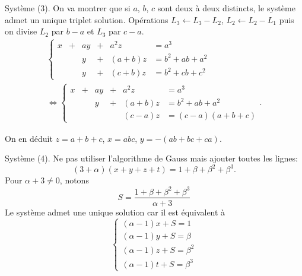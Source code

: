 Système (3). On va montrer que si $a$, $b$, $c$ sont deux à deux distincts, le système admet un unique triplet solution.\newline
Opérations $L_3 \leftarrow L_3 - L_2$, $L_2 \leftarrow L_2 - L_1$ puis on divise $L_2$ par $b-a$ et $L_3$ par $c-a$.
\begin{multline*}
  \left\lbrace 
  \begin{alignedat}{4}
    x &+& ay &+& a^2z   &= a^3 \\
      & & y  &+& (a+b)z &= b^2 + ab + a^2 \\
      & & y  &+& (c+b)z &= b^2 + cb + c^2
  \end{alignedat}
\right. \\
\Leftrightarrow
  \left\lbrace 
  \begin{alignedat}{4}
    x &+& ay &+& a^2z   &= a^3 \\
      & & y  &+& (a+b)z &= b^2 + ab + a^2 \\
      & &    & & (c-a)z &= (c-a)(a+b+c)
  \end{alignedat}
\right. .
\end{multline*}

On en déduit $z=a+b+c$, $x = abc$, $y=-(ab +bc+ca)$.

Système (4).\newline
Ne pas utiliser l'algorithme de Gauss mais ajouter toutes les lignes:
\[
  (3+\alpha)(x+y+z+t) = 1+\beta+\beta^2+\beta^3.
\]
Pour $\alpha + 3 \neq 0$, notons
\[
  S = \frac{1+\beta+\beta^2+\beta^3}{\alpha + 3}
\]
Le système admet une unique solution car il est équivalent à
\[
  \left\lbrace 
  \begin{aligned}
    (\alpha - 1)x + S = 1 \\
    (\alpha - 1)y + S = \beta \\
    (\alpha - 1)z + S = \beta^2 \\
    (\alpha - 1)t + S = \beta^3 
  \end{aligned}
\right.
\]


